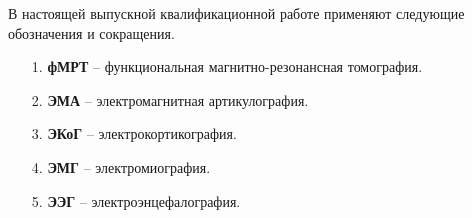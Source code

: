 
В настоящей выпускной квалификационной работе применяют следующие обозначения и сокращения.


\begin{itemize}
    \setlength\itemsep{0.8em plus 0.2em minus 0.2em}
    \item[1.]  \textbf{фМРТ} -- функциональная магнитно-резонансная томография.
    \item[2.]  \textbf{ЭМА} -- электромагнитная артикулография.
    \item[3.]  \textbf{ЭКоГ} -- электрокортикография.
    \item[4.]  \textbf{ЭМГ} -- электромиография.
    \item[5.]  \textbf{ЭЭГ} -- электроэнцефалография.



\end{itemize}
